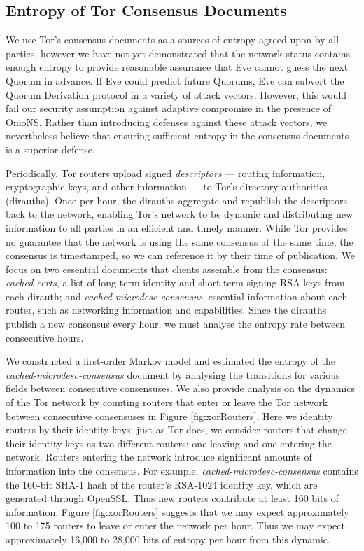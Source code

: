 \subsection{Entropy of Tor Consensus Documents}
\label{sec:docEntropy}

We use Tor's consensus documents as a sources of entropy agreed upon by all parties, however we have not yet demonstrated that the network status contains enough entropy to provide reasonable assurance that Eve cannot guess the next Quorum in advance. If Eve could predict future Quorums, Eve can subvert the Quorum Derivation protocol in a variety of attack vectors. However, this would fail our security assumption against adaptive compromise in the presence of OnioNS. Rather than introducing defenses against these attack vectors, we nevertheless believe that ensuring sufficient entropy in the consensus documents is a superior defense.

Periodically, Tor routers upload signed \emph{descriptors} --- routing information, cryptographic keys, and other information --- to Tor's directory authorities (dirauths). Once per hour, the dirauths aggregate and republish the descriptors back to the network, enabling Tor's network to be dynamic and distributing new information to all parties in an efficient and timely manner. While Tor provides no guarantee that the network is using the same consensus at the same time, the consensus is timestamped, so we can reference it by their time of publication. We focus on two essential documents that clients assemble from the consensus: \emph{cached-certs}, a list of long-term identity and short-term signing RSA keys from each dirauth; and \emph{cached-microdesc-consensus}, essential information about each router, such as networking information and capabilities. Since the dirauths publish a new consensus every hour, we must analyse the entropy rate between consecutive hours.

We constructed a first-order Markov model and estimated the entropy of the \emph{cached-microdesc-consensus} document by analysing the transitions for various fields between consecutive consensuses. We also provide analysis on the dynamics of the Tor network by counting routers that enter or leave the Tor network between consecutive consensuses in Figure \ref{fig:xorRouters}. Here we identity routers by their identity keys; just as Tor does, we consider routers that change their identity keys as two different routers; one leaving and one entering the network. Routers entering the network introduce significant amounts of information into the consensus. For example, \emph{cached-microdesc-consensus} contains the 160-bit SHA-1 hash of the router's RSA-1024 identity key, which are generated through OpenSSL. Thus new routers contribute at least 160 bits of information. Figure \ref{fig:xorRouters} suggests that we may expect approximately 100 to 175 routers to leave or enter the network per hour. Thus we may expect approximately 16,000 to 28,000 bits of entropy per hour from this dynamic.

